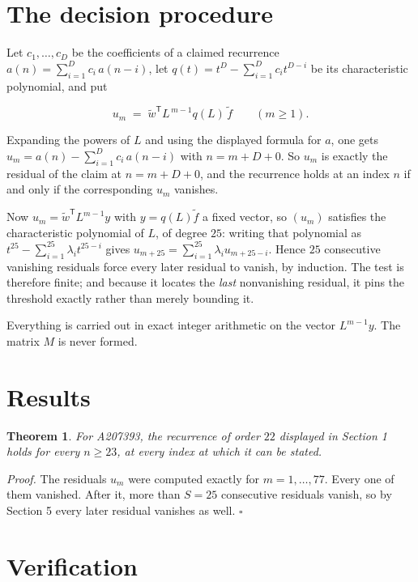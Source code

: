 \documentclass[11pt]{article}
\newtheorem{theorem}{Theorem}
\theoremstyle{definition}
\begin{document}
\section{The decision procedure}

Let $c_1,\dots,c_D$ be the coefficients of a claimed recurrence $a(n) = \sum_{i=1}^{D} c_i\,a(n-i)$, let $q(t) = t^{D} - \sum_{i=1}^{D} c_i t^{D-i}$ be its characteristic polynomial, and put

\[u_m \;=\; \tilde w^{\mathsf T} L^{\,m-1} q(L)\,\tilde f \qquad (m \ge 1).\]

Expanding the powers of $L$ and using the displayed formula for $a$, one gets $u_m = a(n) - \sum_{i=1}^{D} c_i\,a(n-i)$ with $n = m + D + 0$. So $u_m$ is exactly the residual of the claim at $n = m + D + 0$, and the recurrence holds at an index $n$ if and only if the corresponding $u_m$ vanishes.

Now $u_m = \tilde w^{\mathsf T} L^{m-1} y$ with $y = q(L)\tilde f$ a fixed vector, so $(u_m)$ satisfies the characteristic polynomial of $L$, of degree $25$: writing that polynomial as $t^{25} - \sum_{i=1}^{25} \lambda_i t^{25-i}$ gives $u_{m+25} = \sum_{i=1}^{25} \lambda_i u_{m+25-i}$. Hence $25$ consecutive vanishing residuals force every later residual to vanish, by induction. The test is therefore finite; and because it locates the {\itshape last} nonvanishing residual, it pins the threshold exactly rather than merely bounding it.

Everything is carried out in exact integer arithmetic on the vector $L^{m-1}y$. The matrix $M$ is never formed.

\section{Results}

\begin{theorem} For A207393, the recurrence of order $22$ displayed in Section 1 holds for every $n \ge 23$, at every index at which it can be stated.\end{theorem}

{\itshape Proof.} The residuals $u_m$ were computed exactly for $m = 1,\dots,77$. Every one of them vanished. After it, more than $S = 25$ consecutive residuals vanish, so by Section 5 every later residual vanishes as well. $\square$

\section{Verification}
\end{document}
